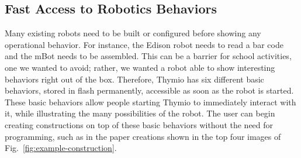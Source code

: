 \documentclass[letterpaper, 10 pt, conference]{ieeeconf}  %
\begin{document}
\subsection{Fast Access to Robotics Behaviors}
\label{sec:behaviors}

Many existing robots need to be built or configured before showing any operational behavior. 
For instance, the Edison robot needs to read a bar code and the mBot needs to be assembled.
This can be a barrier for school activities, one we wanted to avoid; rather, we wanted a robot able to show interesting behaviors right out of the box.
Therefore, Thymio has six different basic behaviors, stored in flash permanently, accessible as soon as the robot is started.
These basic behaviors allow people starting Thymio to immediately interact with it, while illustrating the many possibilities of the robot.
The user can begin creating constructions on top of these basic behaviors without the need for programming, such as in the paper creations shown in the top four images of Fig.~\ref{fig:example-construction}.

\end{document}
